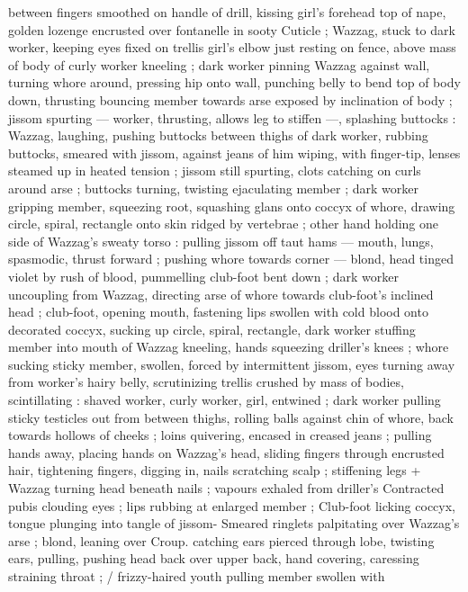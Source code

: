 {between fingers smoothed on handle of drill, kissing girl's forehead 
top of nape, golden lozenge encrusted over fontanelle in sooty 
Cuticle ; Wazzag, stuck to dark worker, keeping eyes fixed on trellis 
girl's elbow just resting on fence, above mass of body of curly 
worker kneeling ; dark worker pinning Wazzag against wall, turning 
whore around, pressing hip onto wall, punching belly to bend top of 
body down, thrusting bouncing member towards arse exposed by 
inclination of body ; jissom spurting --- worker, thrusting, allows leg 
to stiffen ---, splashing buttocks : Wazzag, laughing, pushing 
buttocks between thighs of dark worker, rubbing buttocks, smeared 
with jissom, against jeans of him wiping, with finger-tip, lenses 
steamed up in heated tension ; jissom still spurting, clots catching on 
curls around arse ; buttocks turning, twisting ejaculating member ; 
dark worker gripping member, squeezing root, squashing glans onto 
coccyx of whore, drawing circle, spiral, rectangle onto skin ridged by 
vertebrae ; other hand holding one side of Wazzag's sweaty torso : 
pulling jissom off taut hams --- mouth, lungs, spasmodic, thrust 
forward ; pushing whore towards corner --- blond, head tinged violet 
by rush of blood, pummelling club-foot bent down ; dark worker 
uncoupling from Wazzag, directing arse of whore towards club-foot's 
inclined head ; club-foot, opening mouth, fastening lips swollen with 
cold blood onto decorated coccyx, sucking up circle, spiral, 
rectangle, dark worker stuffing member into mouth of Wazzag 
kneeling, hands squeezing driller's knees ; whore sucking sticky 
member, swollen, forced by intermittent jissom, eyes turning away 
from worker's hairy belly, scrutinizing trellis crushed by mass of 
bodies, scintillating : shaved worker, curly worker, girl, entwined ; 
dark worker pulling sticky testicles out from between thighs, rolling 
balls against chin of whore, back towards hollows of cheeks ; loins 
quivering, encased in creased jeans ; pulling hands away, placing 
hands on Wazzag's head, sliding fingers through encrusted hair, 
tightening fingers, digging in, nails scratching scalp ; stiffening legs 
+ Wazzag turning head beneath nails ; vapours exhaled from driller's 
Contracted pubis clouding eyes ; lips rubbing at enlarged member ; 
Club-foot licking coccyx, tongue plunging into tangle of jissom- 
Smeared ringlets palpitating over Wazzag's arse ; blond, leaning over 
Croup. catching ears pierced through lobe, twisting ears, pulling, 
pushing head back over upper back, hand covering, caressing 
straining throat ; {\slash} frizzy-haired youth pulling member swollen with 
}
